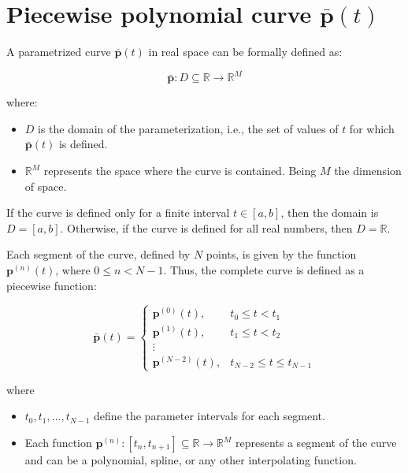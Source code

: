 \section{Piecewise polynomial curve $\mathbf{\bar{p}}(t)$}
\label{sec:curvePiecewise}
A parametrized curve $\mathbf{\bar{p}}(t)$ in real space can be formally defined as:

\begin{equation}
\mathbf{\bar{p}}: D \subseteq \mathbb{R} \to \mathbb{R}^M
\end{equation}

where: 

\begin{itemize}
\item $D$ is the domain of the parameterization, i.e., the set of values of $t$ for which $\mathbf{\bar{p}}(t)$ is defined.  
\item $\mathbb{R}^M$ represents the space where the curve is contained.
Being $M$ the dimension of space.
\end{itemize}

If the curve is defined only for a finite interval $t \in [a, b]$, then the domain is $D = [a, b]$. Otherwise, if the curve is defined for all real numbers, then $D = \mathbb{R}$.  




Each segment of the curve, defined by $N$ points, is given by the function $\mathbf{p}^{(n)}(t)$, where $0 \leq n < N-1$.  
Thus, the complete curve is defined as a piecewise function:

\begin{equation}\label{eq:phatt}
\mathbf{\bar{p}}(t) =
\begin{cases} 
\mathbf{p}^{(0)}(t), & t_0 \leq t < t_1 \\
\mathbf{p}^{(1)}(t), & t_1 \leq t < t_2 \\
\vdots \\
\mathbf{p}^{(N-2)}(t), & t_{N-2} \leq t \leq t_{N-1}
\end{cases}
\end{equation}

where
\begin{itemize}
\item $t_0, t_1, \dots, t_{N-1} $ define the parameter intervals for each segment.  
\item Each function $\mathbf{p}^{(n)}: [t_{n},t_{n+1}] \subseteq \mathbb{R} \to \mathbb{R}^M$ represents a segment of the curve and can be a polynomial, spline, or any other interpolating function.  
\end{itemize}


